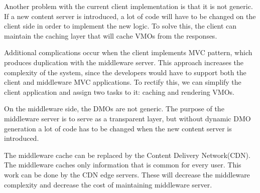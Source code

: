 Another problem with the current client implementation is that it is not generic. If a new content server is introduced, a lot of code will have to be changed on the client side in order to implement the new logic. To solve this, the client can maintain the caching layer that will cache VMOs from the responses. 

Additional complications occur when the client implements MVC pattern, which produces duplication with the middleware server. This approach increases the complexity of the system, since the developers would have to support both the client and middleware MVC applications. To rectify this, we can simplify the client application and assign two tasks to it: caching and rendering VMOs.

On the middleware side, the DMOs are not generic. The purpose of the middleware server is to serve as a transparent layer, but without dynamic DMO generation a lot of code has to be changed when the new content server is introduced.

The middleware cache can be replaced by the Content Delivery Network(CDN). The middleware caches only information that is common for every user. This work can be done by the CDN edge servers. These will decrease the middleware complexity and decrease the cost of maintaining middleware server.


\newpage
